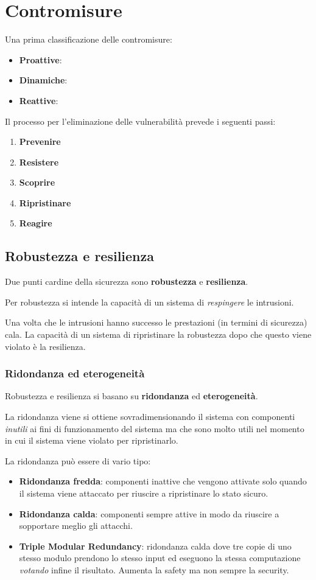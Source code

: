 \chapter{Contromisure}
Una prima classificazione delle contromisure:
\begin{itemize}
	\item \textbf{Proattive}:
	\item \textbf{Dinamiche}:
	\item \textbf{Reattive}:
\end{itemize}
Il processo per l'eliminazione delle vulnerabilità prevede i seguenti passi:
\begin{enumerate}
	\item \textbf{Prevenire}
	\item \textbf{Resistere}
	\item \textbf{Scoprire}
	\item \textbf{Ripristinare}
	\item \textbf{Reagire}
\end{enumerate}

\section{Robustezza e resilienza}
Due punti cardine della sicurezza sono \textbf{robustezza} e \textbf{resilienza}.

Per robustezza si intende la capacità di un sistema di \emph{respingere} le intrusioni.

Una volta che le intrusioni hanno successo le prestazioni (in termini di sicurezza) cala. La capacità di un sistema
di ripristinare la robustezza dopo che questo viene violato è la resilienza.

\subsection{Ridondanza ed eterogeneità}
Robustezza e resilienza si basano su \textbf{ridondanza} ed \textbf{eterogeneità}.

La ridondanza viene si ottiene sovradimensionando il sistema con componenti \emph{inutili} ai fini di funzionamento
del sistema ma che sono molto utili nel momento in cui il sistema viene violato per ripristinarlo.

La ridondanza può essere di vario tipo:
\begin{itemize}
	\item \textbf{Ridondanza fredda}: componenti inattive che vengono attivate solo quando il sistema viene attaccato
	      per riuscire a ripristinare lo stato sicuro.
	\item \textbf{Ridondanza calda}: componenti sempre attive in modo da riuscire a sopportare meglio gli attacchi.
	\item \textbf{Triple Modular Redundancy}: ridondanza calda dove tre copie di uno stesso modulo prendono lo stesso
	      input ed eseguono la stessa computazione \emph{votando} infine il risultato. Aumenta la safety ma non sempre
	      la security.
\end{itemize}

